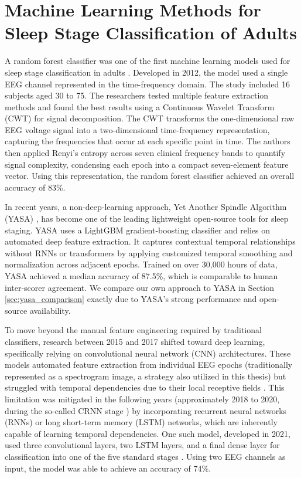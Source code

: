 \section{Machine Learning Methods for Sleep Stage Classification of Adults}
A random forest classifier was one of the first machine learning models used for sleep stage classification in adults \cite{FRAIWAN201210}.
Developed in 2012, the model used a single EEG channel represented in the time-frequency domain. The study included 16 
subjects aged 30 to 75. The researchers tested multiple feature extraction methods and found the 
best results using a Continuous Wavelet Transform (CWT) for signal decomposition.
The CWT transforms the one-dimensional raw EEG voltage signal into a two-dimensional 
time-frequency representation, capturing the frequencies that occur at each specific point in time. 
The authors then applied Renyi's entropy across seven clinical frequency bands to quantify signal complexity, 
condensing each epoch into a compact seven-element feature vector. Using this representation, 
the random forest classifier achieved an overall accuracy of 83\%.

In recent years, a non-deep-learning approach, Yet Another Spindle Algorithm (YASA) \cite{VallatWalker2021}, has become one of the
leading lightweight open-source tools for sleep staging. YASA uses a LightGBM gradient-boosting classifier and relies on automated
deep feature extraction. It captures contextual temporal relationships without RNNs or transformers by applying customized 
temporal smoothing and normalization across adjacent epochs. Trained on over 30,000 hours of data, YASA achieved a median
accuracy of 87.5\%, which is comparable to human inter-scorer agreement. 
We compare our own approach to YASA in Section \ref{sec:yasa_comparison} exactly due to YASA's strong performance and open-source availability.

To move beyond the manual feature engineering required by traditional classifiers, 
research between 2015 and 2017 shifted toward deep learning, specifically relying on 
convolutional neural network (CNN) architectures. These models automated feature extraction 
from individual EEG epochs (traditionally represented as a spectrogram image, a strategy also 
utilized in this thesis) but struggled with temporal dependencies due to their local 
receptive fields \cite{Yang2026}. This limitation was mitigated in the following years 
(approximately 2018 to 2020, during the so-called CRNN stage \cite{Yang2026}) by 
incorporating recurrent neural networks (RNNs) or long short-term memory (LSTM) networks, 
which are inherently capable of learning temporal dependencies. One such model, developed in 2021, 
used three convolutional layers, two LSTM layers, and a final dense layer for classification 
into one of the five standard stages \cite{cnnlstm2021}. Using two EEG channels as input, 
the model was able to achieve an accuracy of 74\%.

